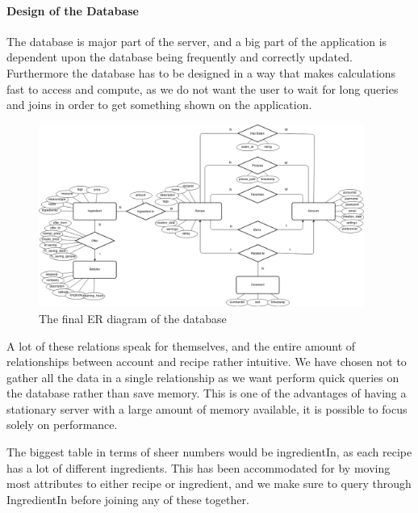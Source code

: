 \paragraph{Design of the Database}
\label{para:dbdesign}

The database is major part of the server, and a big part of the application is dependent upon the database being frequently and correctly updated. Furthermore the database has to be designed in a way that makes calculations fast to access and compute, as we do not want the user to wait for long queries and joins in order to get something shown on the application. 

\begin{figure}
\label{fig:ER-diagram}
\centering
\includegraphics[width=0.95\textwidth]{Pictures/ERdiagram}
\caption{The final ER diagram of the database}
\end{figure}

A lot of these relations speak for themselves, and the entire amount of relationships between account and recipe rather intuitive. We have chosen not to gather all the data in a single relationship as we want perform quick queries on the database rather than save memory. This is one of the advantages of having a stationary server with a large amount of memory available, it is possible to focus solely on performance. 

The biggest table in terms of sheer numbers would be ingredientIn, as each recipe has a lot of different ingredients. This has been accommodated for by moving most attributes to either recipe or ingredient, and we make sure to query through IngredientIn before joining any of these together.

